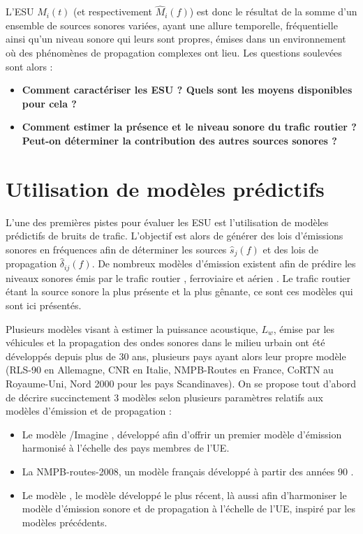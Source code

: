 L'ESU $M_i(t)$ (et respectivement $\hat{M}_i(f)$) est donc le résultat de la somme d'un ensemble de sources sonores variées, ayant une allure temporelle, fréquentielle ainsi qu'un niveau sonore qui leurs sont propres, émises dans un environnement où des phénomènes de propagation complexes ont lieu. Les questions soulevées sont alors :

\begin{itemize}
\item \textbf{Comment caractériser les ESU ? Quels sont les moyens disponibles pour cela ?}
\item \textbf{Comment estimer la présence et le niveau sonore du trafic routier ? Peut-on déterminer la contribution des autres sources sonores ?}\\
\end{itemize}

\section{Utilisation de modèles prédictifs}

L'une des premières pistes pour évaluer les ESU est l'utilisation de modèles prédictifs de bruits de trafic. L'objectif est alors de générer des lois d'émissions sonores en fréquences afin de déterminer les sources $\hat{s}_j(f)$ et des lois de propagation $\hat{\delta}_{ij}(f)$. De nombreux modèles d'émission existent afin de prédire les niveaux sonores émis par le trafic routier \cite{quartieri2009review}, ferroviaire \cite{van2000railway} et aérien \cite{zaporozhets1998aircraft}. Le trafic routier étant la source sonore la plus présente et la plus gênante, ce sont ces modèles qui sont ici présentés.

Plusieurs modèles visant à estimer la puissance acoustique, $L_w$, émise par les véhicules et la propagation des ondes sonores dans le milieu urbain ont été développés depuis plus de 30 ans, plusieurs pays ayant alors leur propre modèle (RLS-90 en Allemagne, CNR en Italie, NMPB-Routes en France, CoRTN au Royaume-Uni, Nord 2000 pour les pays Scandinaves). On se propose tout d'abord de décrire succinctement 3 modèles selon plusieurs paramètres relatifs aux modèles d'émission et de propagation :

\begin{itemize}
\item Le modèle /Imagine \cite{jonasson2004source}, développé afin d'offrir un premier modèle d'émission harmonisé à l'échelle des pays membres de l'UE.
\item La NMPB-routes-2008, un modèle français développé à partir des années 90 \cite{setra_prevision_2009-1, setra_prevision_2009-2}.
\item Le modèle   \cite{CNOSSOS}, le modèle développé le plus récent, là aussi afin d'harmoniser le modèle d'émission sonore et de propagation à l'échelle de l'UE, inspiré par les modèles précédents.
\end{itemize}

